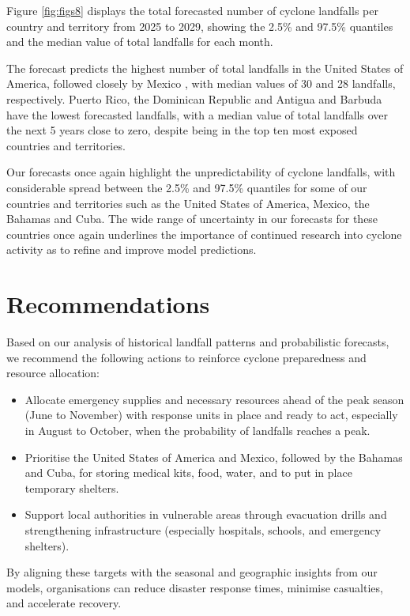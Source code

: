 \documentclass[
]{article}
\providecommand{\tightlist}{%
  \setlength{\itemsep}{0pt}\setlength{\parskip}{0pt}}
\begin{document}
Figure \ref{fig:figs8} displays the total forecasted number of cyclone landfalls per country and territory from 2025 to 2029, showing the 2.5\% and 97.5\% quantiles and the median value of total landfalls for each month.

The forecast predicts the highest number of total landfalls in the United States of America, followed closely by Mexico , with median values of 30 and 28 landfalls, respectively. Puerto Rico, the Dominican Republic and Antigua and Barbuda have the lowest forecasted landfalls, with a median value of total landfalls over the next 5 years close to zero, despite being in the top ten most exposed countries and territories.

Our forecasts once again highlight the unpredictability of cyclone landfalls, with considerable spread between the 2.5\% and 97.5\% quantiles for some of our countries and territories such as the United States of America, Mexico, the Bahamas and Cuba. The wide range of uncertainty in our forecasts for these countries once again underlines the importance of continued research into cyclone activity as to refine and improve model predictions.

\section{Recommendations}\label{recommendations}

Based on our analysis of historical landfall patterns and probabilistic forecasts, we recommend the following actions to reinforce cyclone preparedness and resource allocation:

\begin{itemize}
\tightlist
\item
  Allocate emergency supplies and necessary resources ahead of the peak season (June to November) with response units in place and ready to act, especially in August to October, when the probability of landfalls reaches a peak.
\item
  Prioritise the United States of America and Mexico, followed by the Bahamas and Cuba, for storing medical kits, food, water, and to put in place temporary shelters.
\item
  Support local authorities in vulnerable areas through evacuation drills and strengthening infrastructure (especially hospitals, schools, and emergency shelters).
\end{itemize}

By aligning these targets with the seasonal and geographic insights from our models, organisations can reduce disaster response times, minimise casualties, and accelerate recovery.
\end{document}
